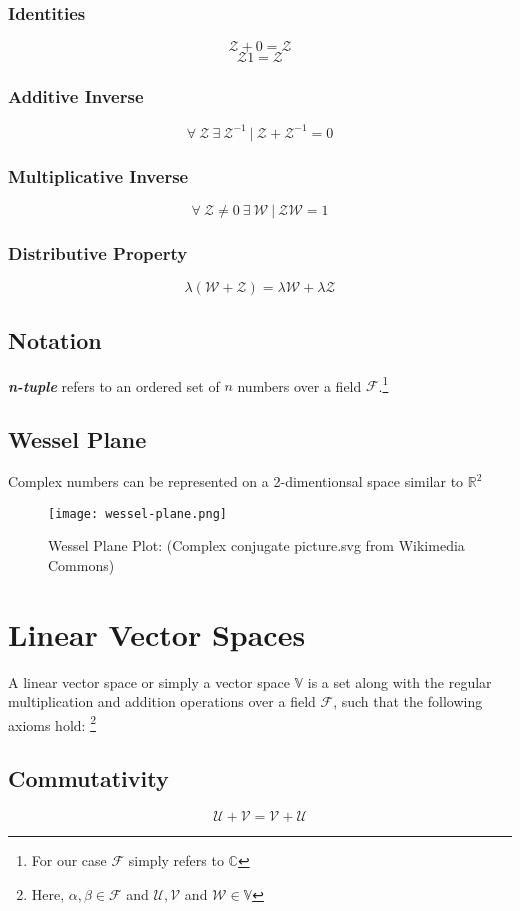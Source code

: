 \subsubsection{Identities}
$$\mathcal{Z} + 0 = \mathcal{Z}$$
$$\mathcal{Z}1 = \mathcal{Z}$$
\subsubsection{Additive Inverse}
$$\forall \ \mathcal{Z} \ \exists \ \mathcal{Z}^{-1} \ | \ \mathcal{Z} + \mathcal{Z}^{-1} = 0$$
\subsubsection{Multiplicative Inverse}
$$\forall \  \mathcal{Z} \neq 0 \ \exists \ \mathcal{W} \ | \ \mathcal{Z}\mathcal{W} = 1$$
\subsubsection{Distributive Property}
$$\lambda(\mathcal{W} + \mathcal{Z}) = \lambda\mathcal{W} + \lambda\mathcal{Z}$$
\subsection{Notation}
\textit{\textbf{n-tuple}} refers to an ordered set of $n$ numbers over a field $\mathcal{F}$.\footnote{For our case $\mathcal{F}$ simply refers to $\mathbb{C}$}
\subsection{Wessel Plane}
Complex numbers can be represented on a 2-dimentionsal space similar to $\mathbb{R}^{2}$
\begin{figure}
	\centering
	\texttt{[image: wessel-plane.png]}
	\caption{Wessel Plane Plot: (Complex conjugate picture.svg from Wikimedia Commons)}
\end{figure}
\section{Linear Vector Spaces} 
A linear vector space or simply a vector space $\mathbb{V}$ is a set along with the regular multiplication and addition operations over a field $\mathcal{F}$, such that the following axioms hold: \footnote{Here, $\alpha , \beta \in \mathcal{F}$ and $\mathcal{U}, \mathcal{V} $ and $\mathcal{W} \in \mathbb{V}$} \\
\subsection{Commutativity}
$$\mathcal{U} + \mathcal{V} = \mathcal{V} + \mathcal{U}$$

